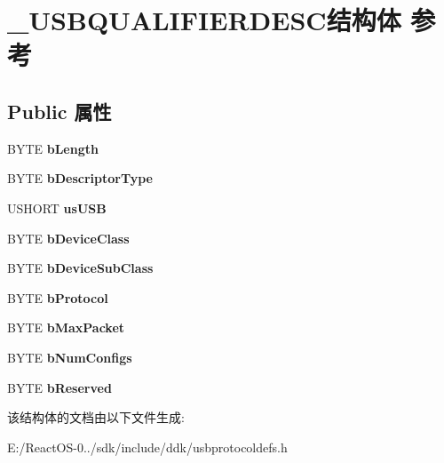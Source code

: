 \hypertarget{struct___u_s_b_q_u_a_l_i_f_i_e_r_d_e_s_c}{}\section{\+\_\+\+U\+S\+B\+Q\+U\+A\+L\+I\+F\+I\+E\+R\+D\+E\+S\+C结构体 参考}
\label{struct___u_s_b_q_u_a_l_i_f_i_e_r_d_e_s_c}
\subsection*{Public 属性}
\begin{DoxyCompactItemize}
\item 
\mbox{\label{struct___u_s_b_q_u_a_l_i_f_i_e_r_d_e_s_c_a0cc3d9f546e079363ffbe5a306d603a8}} 
B\+Y\+TE {\bfseries b\+Length}
\item 
\mbox{\label{struct___u_s_b_q_u_a_l_i_f_i_e_r_d_e_s_c_a4e266c96d4e4e26cae23369d9a5a0303}} 
B\+Y\+TE {\bfseries b\+Descriptor\+Type}
\item 
\mbox{\label{struct___u_s_b_q_u_a_l_i_f_i_e_r_d_e_s_c_a0c6a6c92d72e6d2f80c765658f4a8fe9}} 
U\+S\+H\+O\+RT {\bfseries us\+U\+SB}
\item 
\mbox{\label{struct___u_s_b_q_u_a_l_i_f_i_e_r_d_e_s_c_aa10317ae804b8d4567b43e45bec56e3d}} 
B\+Y\+TE {\bfseries b\+Device\+Class}
\item 
\mbox{\label{struct___u_s_b_q_u_a_l_i_f_i_e_r_d_e_s_c_a114b89a363cd1b48b39fa151f9eda611}} 
B\+Y\+TE {\bfseries b\+Device\+Sub\+Class}
\item 
\mbox{\label{struct___u_s_b_q_u_a_l_i_f_i_e_r_d_e_s_c_aa3568b18fa428b8d787399c9d5618ec1}} 
B\+Y\+TE {\bfseries b\+Protocol}
\item 
\mbox{\label{struct___u_s_b_q_u_a_l_i_f_i_e_r_d_e_s_c_aebeed5b405012e81fe953b2ee77ed6cf}} 
B\+Y\+TE {\bfseries b\+Max\+Packet}
\item 
\mbox{\label{struct___u_s_b_q_u_a_l_i_f_i_e_r_d_e_s_c_a0877343c3dee346ee26f8a73d93e19ee}} 
B\+Y\+TE {\bfseries b\+Num\+Configs}
\item 
\mbox{\label{struct___u_s_b_q_u_a_l_i_f_i_e_r_d_e_s_c_a37deaf60228e9409493016d36f1082b0}} 
B\+Y\+TE {\bfseries b\+Reserved}
\end{DoxyCompactItemize}


该结构体的文档由以下文件生成\+:\begin{DoxyCompactItemize}
\item 
E\+:/\+React\+O\+S-\/0../sdk/include/ddk/usbprotocoldefs.\+h\end{DoxyCompactItemize}
